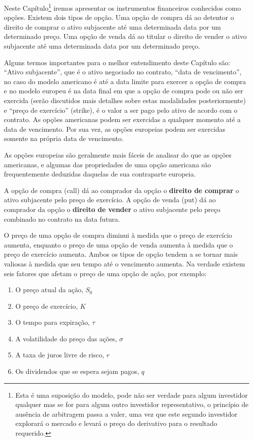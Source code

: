 \documentclass[]{book}
\providecommand{\tightlist}{%
  \setlength{\itemsep}{0pt}\setlength{\parskip}{0pt}}
\let\rmarkdownfootnote\footnote%
\def\footnote{\protect\rmarkdownfootnote}
\begin{document}
Neste Capítulo\footnote{Esta é uma suposição do modelo, pode não ser
  verdade para algum investidor qualquer mas se for para algum outro
  investidor representativo, o princípio de ausência de arbitragem passa
  a valer, uma vez que este segundo investidor explorará o mercado e
  levará o preço do derivativo para o resultado requerido.} iremos
apresentar os instrumentos financeiros conhecidos como opções. Existem
dois tipos de opção. Uma opção de compra dá ao detentor o direito de
comprar o ativo subjacente até uma determinada data por um determinado
preço. Uma opção de venda dá ao titular o direito de vender o ativo
subjacente até uma determinada data por um determinado preço.

Alguns termos importantes para o melhor entendimento deste Capítulo são:
``Ativo subjacente'', que é o ativo negociado no contrato, ``data de
vencimento'', no caso do modelo americano é até a data limite para
exercer a opção de compra e no modelo europeu é na data final em que a
opção de compra pode ou não ser exercida (serão discutidos mais detalhes
sobre estas modalidades posteriormente) e ``preço de exercício''
(strike), é o valor a ser pago pelo ativo de acordo com o contrato. As
opções americanas podem ser exercidas a qualquer momento até a data de
vencimento. Por sua vez, as opções europeias podem ser exercidas somente
na própria data de vencimento.

As opções europeias são geralmente mais fáceis de analisar do que as
opções americanas, e algumas das propriedades de uma opção americana são
frequentemente deduzidas daquelas de sua contraparte europeia.

A opção de compra (call) dá ao comprador da opção o \textbf{direito de
comprar} o ativo subjacente pelo preço de exercício. A opção de venda
(put) dá ao comprador da opção o \textbf{direito de vender} o ativo
subjacente pelo preço combinado no contrato na data futura.

O preço de uma opção de compra diminui à medida que o preço de exercício
aumenta, enquanto o preço de uma opção de venda aumenta à medida que o
preço de exercício aumenta. Ambos os tipos de opção tendem a se tornar
mais valiosas à medida que seu tempo até o vencimento aumenta. Na
verdade existem seis fatores que afetam o preço de uma opção de ação,
por exemplo:

\begin{enumerate}
\def\labelenumi{\arabic{enumi}.}
\tightlist
\item
  O preço atual da ação, \(S_0\)
\item
  O preço de exercício, \(K\)
\item
  O tempo para expiração, \(\tau\)
\item
  A volatilidade do preço das ações, \(\sigma\)
\item
  A taxa de juros livre de risco, \(r\)
\item
  Os dividendos que se espera sejam pagos, \(q\)
\end{enumerate}
\end{document}
